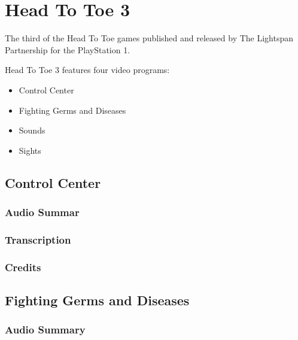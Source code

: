 \chapter{Head To Toe 3}


The third of the Head To Toe games published and released by The Lightspan Partnership for the PlayStation 1.

Head To Toe 3 features four video programs:

\begin{itemize}
    \item Control Center
    \item Fighting Germs and Diseases
    \item Sounds
    \item Sights
\end{itemize}

\clearpage
\newpage

\section{Control Center}

\subsection{Audio Summar}

\subsection{Transcription}

\subsection{Credits}

\section{Fighting Germs and Diseases}

\subsection{Audio Summary}

